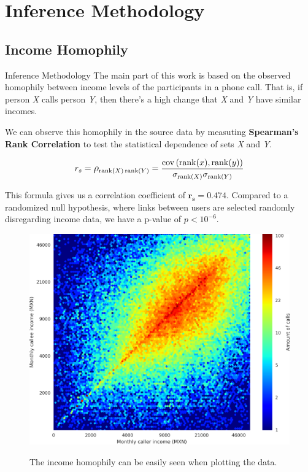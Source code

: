 \documentclass{beamer}
\begin{document}
\section{Inference Methodology}
\subsection{Income Homophily}

\begin{frame}{Inference Methodology}
The main part of this work is based on the observed homophily between income levels of the participants in a phone call. That is, if person \emph{X} calls person \emph{Y}, then there's a high change that \emph{X} and \emph{Y} have similar incomes.
	
We can observe this homophily in the source data by measuting \textbf{Spearman's Rank Correlation} to test the statistical dependence of sets \emph{X} and \emph{Y}.

\[
	r_s = \mathlarger{\rho}_{\operatorname{rank}(X) \operatorname{rank}(Y)} = \frac{\operatorname{cov} \left( \operatorname{rank}(x), \operatorname{rank}(y) \right)}{\sigma_{\operatorname{rank}(X)} \sigma_{\operatorname{rank}(Y)}}
\]

This formula gives us a correlation coefficient of \( \mathbf{r_s = 0.474} \). Compared to a randomized null hypothesis, where links between users are selected randomly disregarding income data, we have a p-value of \( p < 10^{-6} \).

\end{frame}
\begin{frame}

\begin{figure}[h]
	\begin{center}
		{\includegraphics[height=0.8\textheight]
		{../figures/Homophily_income_origin_target_1/Homophily_income_origin_target_1.png}
		}\label{homophily_heatmap}
	\end{center}
	\caption{The income homophily can be easily seen when plotting the data.}
\end{figure}

\end{frame}
\end{document}

